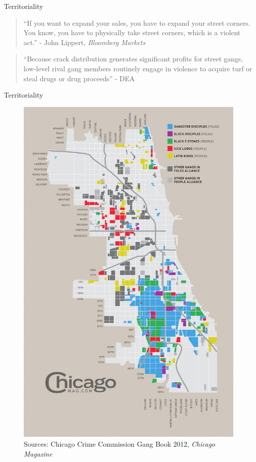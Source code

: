 \documentclass[10pt,ignorenonframetext,]{beamer}
\begin{document}
\begin{frame}{Territoriality}
\protect\hypertarget{territoriality}{}

\begin{quote}
``If you want to expand your sales, you have to expand your street
corners. You know, you have to physically take street corners, which is
a violent act.'' - John Lippert, \emph{Bloomberg Markets}
\end{quote}

\begin{quote}
``Because crack distribution generates significant profits for street
gangs, low-level rival gang members routinely engage in violence to
acquire turf or steal drugs or drug proceeds'' - DEA
\end{quote}

\end{frame}

\begin{frame}{Territoriality}
\protect\hypertarget{territoriality-1}{}

\begin{figure}
\centering
\includegraphics{../chicago/figs/gangmap2012cmag.jpg}
\caption{Sources: Chicago Crime Commission Gang Book 2012, \emph{Chicago
Magazine}}
\end{figure}

\end{frame}
\end{document}
